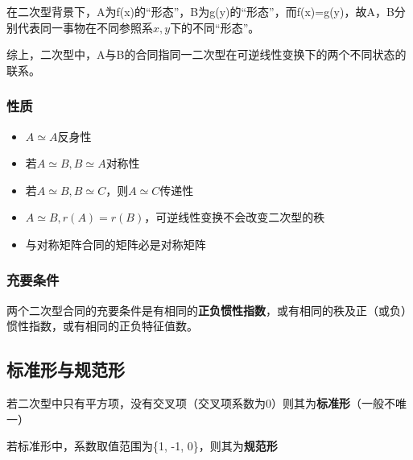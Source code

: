 在二次型背景下，A为f(x)的“形态”，B为g(y)的“形态”，而f(x)=g(y)，故A，B分别代表同一事物在不同参照系\(x, y\)下的不同“形态”。

综上，二次型中，A与B的合同指同一二次型在可逆线性变换下的两个不同状态的联系。


\subsubsection{性质}
\begin{itemize}
    \item \(A \simeq A\)反身性
    \item 若\(A \simeq B, B \simeq A\)对称性
    \item 若\(A \simeq B, B \simeq C\)，则\(A \simeq C\)传递性
    \item \(A \simeq B, r(A) = r(B)\)，可逆线性变换不会改变二次型的秩
    \item 与对称矩阵合同的矩阵必是对称矩阵
\end{itemize}


\subsubsection{充要条件}
两个二次型合同的充要条件是有相同的\textbf{正负惯性指数}，或有相同的秩及正（或负）惯性指数，或有相同的正负特征值数。


\subsection{标准形与规范形}

若二次型中只有平方项，没有交叉项（交叉项系数为0）则其为\textbf{标准形}（一般不唯一）

若标准形中，系数取值范围为\{1, -1, 0\}，则其为\textbf{规范形}


